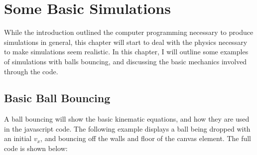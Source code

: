
\chapter{Some Basic Simulations} %

\label{Chapter1} %




While the introduction outlined the computer programming necessary to produce simulations in general, this chapter will start to deal with the physics necessary to make simulations seem realistic.  In this chapter, I will outline some examples of simulations with balls bouncing, and discussing the basic mechanics involved through the code.



\section{Basic Ball Bouncing}

A ball bouncing will show the basic kinematic equations, and how they are used in the javascript code.  The following example displays a ball being dropped with an initial $v_x$, and bouncing off the walls and floor of the canvas element.  The full code is shown below:




